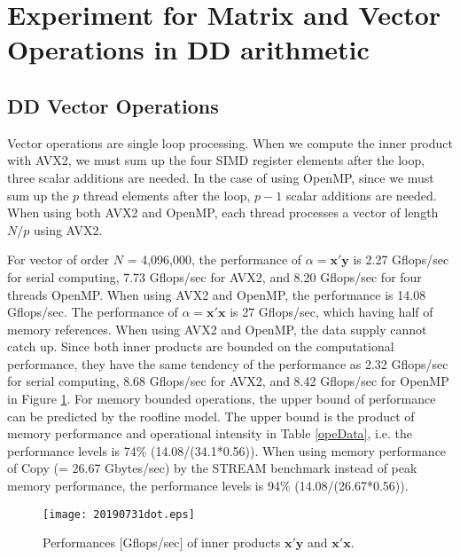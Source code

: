 \documentclass{IOS-Book-Article}
\begin{document}
\section{Experiment for Matrix and Vector Operations in DD arithmetic}
\subsection{DD Vector Operations}
Vector operations are single loop processing. 
When we compute the inner product with AVX2, we must sum up the four SIMD register elements after the loop, three scalar additions are needed.
In the case of using OpenMP, since we must sum up the $p$ thread elements after the loop, $p-1$ scalar additions are needed.
When using both AVX2 and OpenMP, each thread processes a vector of length $N/p$ using AVX2.

For vector of order $N$ = 4,096,000, the performance of $\alpha  = \bm{x}'\bm{y}$ is 2.27 Gflops/sec for serial computing, 7.73 Gflops/sec for AVX2, and 8.20 Gflops/sec for four threads OpenMP. When using AVX2 and OpenMP, the performance is 14.08 Gflops/sec.
The performance of $\alpha = \bm{x}'\bm{x}$ is 27 Gflops/sec, which having half of memory references. 
When using AVX2 and OpenMP, the data supply cannot catch up. 
Since both inner products are bounded on the computational performance, they have the same tendency of the performance as 2.32 Gflops/sec for serial computing, 8.68 Gflops/sec for AVX2, and 8.42 Gflops/sec for OpenMP in Figure \ref{xdot}.
For memory bounded operations, the upper bound of performance can be predicted by the roofline model\cite{roof}. The upper bound is the product of memory performance and operational intensity in Table \ref{opeData}, i.e. the performance levels is 74\% (14.08/(34.1*0.56)). When using memory performance of Copy (= 26.67 Gbytes/sec) by the STREAM benchmark instead of peak memory performance, the performance levels is 94\% (14.08/(26.67*0.56)).

\begin{figure}[htbp]
  \begin{center}
    \texttt{[image: 20190731dot.eps]}
    \caption{Performances [Gflops/sec] of inner products $\bm{x}'\bm{y}$ and $\bm{x}'\bm{x}$.}
    \label{xdot}
  \end{center}
\end{figure}
\end{document}
